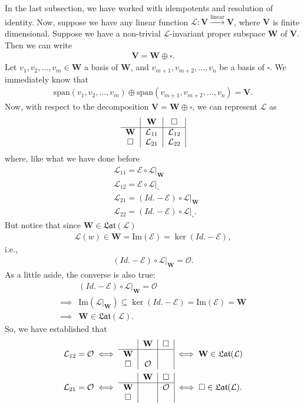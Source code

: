 \documentclass{article}
\theoremstyle{definition}
\newcommand{\V}{\mathbf{V}}
\newcommand{\W}{\mathbf{W}}
\newcommand{\xpan}{\text{span}}
\newcommand{\lag}{\mathcal{L}}
\newcommand{\E}{\mathcal{E}}
\newcommand{\ima}{\text{Im}}
\newcommand{\lin}{\overset{\text{linear}}{\longrightarrow}}
\begin{document}
In the last subsection, we have worked with idempotents and resolution of identity. Now, suppose we have any linear function $\lag : \V \lin \V$, where $\V$ is finite dimensional. Suppose we have a non-trivial $\lag$-invariant proper subspace $\W$ of $\V$. Then we can write
\begin{align*}
\V = \W \oplus \square.
\end{align*}
Let $v_1,v_2,\dots,v_m \in \W$ a basis of $\W$, and $v_{m+1}, v_{m+2},\dots, v_{n}$ be a basis of $\square$. We immediately know that 
\begin{align*}
\xpan(v_1,v_2,\dots,v_m) \oplus \xpan(v_{m+1}, v_{m+2},\dots, v_{n}) = \V.
\end{align*}
Now, with respect to the decomposition $\V = \W \oplus \square$, we can represent $\lag$ as
\begin{align*}
\begin{tabular}{c|c|c|}
& $\W$ & $\square$\\
\hline
$\W$& $\lag_{11}$& $\lag_{12}$\\	
$\square$& $\lag_{21}$ & $\lag_{22}$
\end{tabular}
\end{align*}
where, like what we have done before
\begin{align*}
&\lag_{11} = \E \circ \lag\bigg\vert_{\W}\\
&\lag_{12} = \E \circ \lag\bigg\vert_{\square}\\
&\lag_{21} = (Id.-\E) \circ \lag\bigg\vert_{\W}\\
&\lag_{22} = (Id.-\E) \circ \lag\bigg\vert_{\square}.
\end{align*}
But notice that since $\W \in \mathfrak{Lat}(\lag)$
\begin{align*}
\lag(w) \in \W = \ima(\E) = \ker(Id.- \E),
\end{align*}
i.e.,
\begin{align*}
(Id. - \E)\circ \lag \bigg\vert_{\W} = \mathcal{O}.
\end{align*}
As a little aside, the converse is also true:
\begin{align*}
&(Id. -\E)\circ \lag\bigg\vert_{\W} = \mathcal{O} \\
\implies &\ima\left(\lag\bigg\vert_\W\right) \subseteq \ker(Id. - \E) = \ima(\E) = \W \\
\implies &\W \in \mathfrak{Lat}(\lag).
\end{align*}
So, we have established that 
\begin{align*}
&\lag_{12} = \mathcal{O} \iff \begin{tabular}{c|c|c|}
& $\W$ & $\square$\\
\hline
$\W$& & \\	
$\square$& $\mathcal{O}$ & 
\end{tabular} \iff \W \in \mathfrak{Lat}(\lag)\\
&\lag_{21} = \mathcal{O} \iff \begin{tabular}{c|c|c|}
& $\W$ & $\square$\\
\hline
$\W$&  & $\mathcal{O}$ \\	
$\square$&  & 
\end{tabular} \iff \square \in \mathfrak{Lat}(\lag).
\end{align*}
\end{document}
